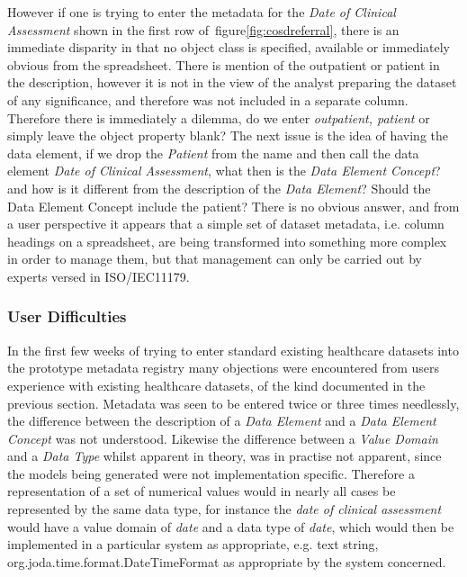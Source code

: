 \documentclass[runningheads]{llncs}
\begin{document}
	However if one is trying to enter the metadata for the \emph{Date of Clinical Assessment} shown in the first row of~figure\ref{fig:cosdreferral}, there is an immediate disparity in that no object class is specified, available or immediately obvious from the spreadsheet. There is mention of the outpatient or patient in the description, however it is not in the view of the analyst preparing the dataset of any significance, and therefore was not included in a separate column. Therefore there is immediately a dilemma, do we enter \emph{outpatient, patient} or simply leave the object property blank? The next issue is the idea of having the data element, if we drop the \emph{Patient} from the name and then call the data element \emph{Date of Clinical Assessment}, what then is the \emph{Data Element Concept}? and how is it different from the description of the \emph{Data Element}? Should the Data Element Concept include the patient? There is no obvious answer, and from a user perspective it appears that a simple set of dataset metadata, i.e. column headings on a spreadsheet, are being transformed into something more complex in order to manage them, but that management can only be carried out by experts versed in ISO/IEC11179.
	
	\subsubsection{User Difficulties}
	In the first few weeks of trying to enter standard existing healthcare datasets into the prototype metadata registry many objections were encountered from users experience with existing healthcare datasets, of the kind documented in the previous section. Metadata was seen to be entered twice or three times needlessly, the difference between the description of a \emph{Data Element} and a \emph{Data Element Concept} was not understood. Likewise the difference between a \emph{Value Domain} and a \emph{Data Type} whilst apparent in theory, was in practise not apparent, since the models being generated were not implementation specific. Therefore a representation of a set of numerical values would in nearly all cases be represented by the same data type, for instance the \emph{date of clinical assessment} would have a value domain of \emph{date} and a data type of \emph{date}, which would then be implemented in a particular system as appropriate, e.g. text string, org.joda.time.format.DateTimeFormat as appropriate by the system concerned. 
	
\end{document}
